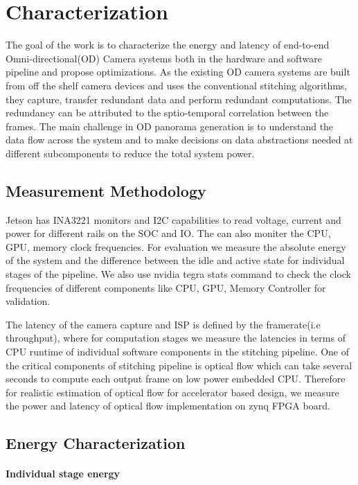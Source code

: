 \chapter{Characterization}

The goal of the work is to characterize the energy and latency of end-to-end Omni-directional(OD) Camera  systems both in the hardware and software pipeline and propose optimizations. As the existing OD camera systems are built from off the shelf camera devices and uses the conventional stitching algorithms, they capture, transfer redundant data and perform redundant computations. The redundancy can be attributed to the sptio-temporal correlation between the frames. The main challenge in OD panorama generation is to understand the data flow across the system and to make decisions on data abstractions needed at different subcomponents to reduce the total system power.


\section{Measurement Methodology} %
Jetson has INA3221 monitors and I2C capabilities to read voltage, current and power for different rails on the SOC and IO. The can also moniter the CPU, GPU, memory clock frequencies. For evaluation we measure the absolute energy of the system and the difference between the idle and active state for individual stages of the pipeline. We also use nvidia tegra stats command to check the clock frequencies of different components like CPU, GPU, Memory Controller for validation. 

The latency of the camera capture and ISP is defined by the framerate(i.e throughput), where for computation stages we measure the latencies in terms of CPU runtime of individual software components in the stitching pipeline. One of the critical components of stitching pipeline is optical flow which can take several seconds to compute each output frame on low power embedded CPU. Therefore for realistic estimation of optical flow for accelerator based design, we measure the power and latency of optical flow implementation on zynq FPGA board. 

\section{Energy Characterization}
\subsubsection{Individual stage energy}

